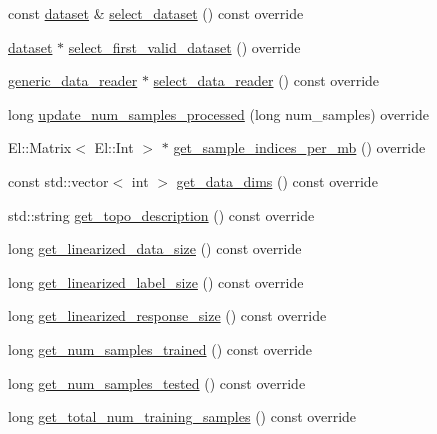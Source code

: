 \begin{DoxyCompactItemize}
\item 
const \hyperlink{classlbann_1_1dataset}{dataset} \& \hyperlink{classlbann_1_1generic__target__layer_ac83761609177fc272fa9c2fe098d4676}{select\+\_\+dataset} () const override
\item 
\hyperlink{classlbann_1_1dataset}{dataset} $\ast$ \hyperlink{classlbann_1_1generic__target__layer_a22374687112c04dd6e0e35b94fe0e46c}{select\+\_\+first\+\_\+valid\+\_\+dataset} () override
\item 
\hyperlink{classlbann_1_1generic__data__reader}{generic\+\_\+data\+\_\+reader} $\ast$ \hyperlink{classlbann_1_1generic__target__layer_a9591bdc69e3de9c10fbf71d1faef917a}{select\+\_\+data\+\_\+reader} () const override
\item 
long \hyperlink{classlbann_1_1generic__target__layer_a0dbe5fc5203e15ddcf8348daf2f697c5}{update\+\_\+num\+\_\+samples\+\_\+processed} (long num\+\_\+samples) override
\item 
El\+::\+Matrix$<$ El\+::\+Int $>$ $\ast$ \hyperlink{classlbann_1_1generic__target__layer_a9673d3fb3db6ecaae979886178b785ea}{get\+\_\+sample\+\_\+indices\+\_\+per\+\_\+mb} () override
\item 
const std\+::vector$<$ int $>$ \hyperlink{classlbann_1_1generic__target__layer_abc0a5ec9761f3cebd34d3549d4681108}{get\+\_\+data\+\_\+dims} () const override
\item 
std\+::string \hyperlink{classlbann_1_1generic__target__layer_ad6ea9a43254664c75aa06e8e5c1d7e8c}{get\+\_\+topo\+\_\+description} () const override
\item 
long \hyperlink{classlbann_1_1generic__target__layer_a26376bcc04f9c8ec35ff99bd71de43d9}{get\+\_\+linearized\+\_\+data\+\_\+size} () const override
\item 
long \hyperlink{classlbann_1_1generic__target__layer_a8a266291fb01fbcec5cac5fefdef56eb}{get\+\_\+linearized\+\_\+label\+\_\+size} () const override
\item 
long \hyperlink{classlbann_1_1generic__target__layer_a55c3e1bcb3e4611c379b1082183b3e66}{get\+\_\+linearized\+\_\+response\+\_\+size} () const override
\item 
long \hyperlink{classlbann_1_1generic__target__layer_abff09be96adbd480f35fcfba3c6cfc5a}{get\+\_\+num\+\_\+samples\+\_\+trained} () const override
\item 
long \hyperlink{classlbann_1_1generic__target__layer_a0187134110cd8a641e15f86e010b75a7}{get\+\_\+num\+\_\+samples\+\_\+tested} () const override
\item 
long \hyperlink{classlbann_1_1generic__target__layer_a857306496e1c55cb15cd81301edb010f}{get\+\_\+total\+\_\+num\+\_\+training\+\_\+samples} () const override

\end{DoxyCompactItemize}
